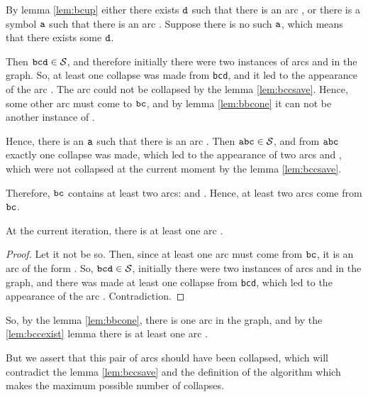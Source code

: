 By lemma \ref{lem:bcup} either there exists $ {\tt d} $ such that there is an arc , or there is a symbol $ {\tt a} $ such that there is an arc . Suppose there is no such $ {\tt a} $, which means that there exists some $ {\tt d} $.

Then $ {\tt bcd} \in {\cal S} $, and therefore initially there were two instances of arcs  and  in the graph. So, at least one collapse was made from {\tt bcd}, and it led to the appearance of the arc . The arc  could not be collapsed by the lemma \ref{lem:bccsave}. Hence, some other arc must come to $ {\tt bc} $, and by lemma \ref{lem:bbcone} it can not be another instance of .

Hence, there is an $ {\tt a} $ such that there is an arc . Then $ {\tt abc} \in {\cal S} $, and from $ {\tt abc} $ exactly one collapse was made, which led to the appearance of two arcs  and , which were not collapsed at the current moment by the lemma \ref{lem:bccsave}.

Therefore, $ {\tt bc} $ contains at least two arcs:  and . Hence, at least two arcs come from $ {\tt bc} $.

\begin{lemma}
\label{lem:bccexist}
At the current iteration, there is at least one arc .
\end{lemma}
\begin{proof}
Let it not be so. Then, since at least one arc must come from $ {\tt bc} $, it is an arc of the form . So, $ {\tt bcd} \in {\cal S} $, initially there were two instances of arcs  and  in the graph, and there was made at least one collapse from {\tt bcd}, which led to the appearance of the arc . Contradiction.
\end{proof}

So, by the lemma \ref{lem:bbcone}, there is one arc  in the graph, and by the \ref{lem:bccexist} lemma there is at least one arc .

But we assert that this pair of arcs should have been collapsed, which will contradict the lemma \ref{lem:bccsave} and the definition of the algorithm which makes the maximum possible number of collapses.

